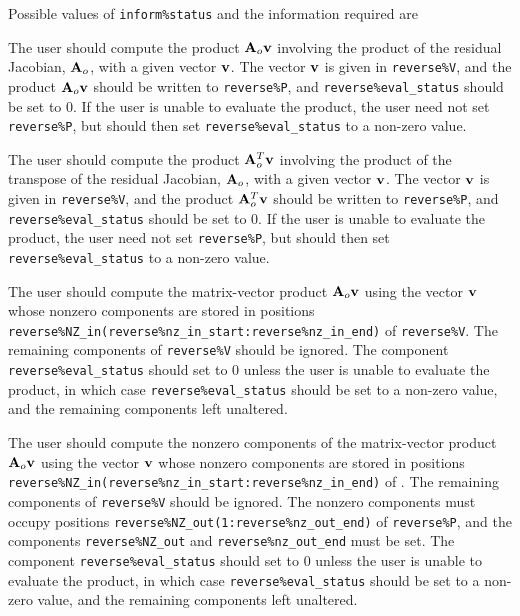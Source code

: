 \documentclass{galahad}
\begin{document}
Possible values of {\tt inform\%status} and the information required are
\begin{description}

 The user should compute the product ${\mathbf{A}}_o {\mathbf{v}}$
     involving the product of the residual Jacobian, ${\mathbf{A}}_o$,
     with a given vector ${\mathbf{v}}$.
     The vector ${\mathbf{v}}$ is given in {\tt reverse\%V}, and the
     product ${\mathbf{A}}_o {\mathbf{v}}$ should be written to {\tt reverse\%P},
     and  {\tt reverse\%eval\_status} should be set to 0.
     If the user is unable to evaluate the product,
     the user need not set {\tt reverse\%P}, but
     should then set {\tt reverse\%eval\_status} to a non-zero value.

 The user should compute the product ${\mathbf{A}}_o^T {\mathbf{v}}$
     involving the product of the transpose of the residual
     Jacobian, ${\mathbf{A}}_o$,  with a given vector ${\mathbf{v}}$.
     The vector ${\mathbf{v}}$ is given in {\tt reverse\%V}, and the
     product ${\mathbf{A}}_o^T {\mathbf{v}}$ should be written to {\tt reverse\%P},
     and  {\tt reverse\%eval\_status} should be set to 0.
     If the user is unable to evaluate the product,
     the user need not set {\tt reverse\%P}, but
     should then set {\tt reverse\%eval\_status} to a non-zero value.

 The user should compute the matrix-vector product ${\mathbf{A}}_o {\mathbf{v}}$
     using the vector ${\mathbf{v}}$ whose nonzero components are stored in positions
     {\tt reverse\%NZ\_in(reverse\%nz\_in\_start:reverse\%nz\_in\_end)}
     of {\tt reverse\%V}. The remaining components of
     {\tt reverse\%V} should be ignored.
     The component {\tt reverse\%eval\_status} should set to 0 unless the
     user is unable to evaluate the product, in which case
     {\tt reverse\%eval\_status} should be set to a non-zero value, and the
     remaining components left unaltered.

 The user should compute the nonzero components of the
     matrix-vector product ${\mathbf{A}}_o {\mathbf{v}}$ using the vector ${\mathbf{v}}$ whose
     nonzero components are stored in positions
     {\tt reverse\%NZ\_in(reverse\%nz\_in\_start:reverse\%nz\_in\_end)}
     of . The remaining components of
     {\tt reverse\%V} should be ignored. The nonzero components must
     occupy positions
     {\tt reverse\%NZ\_out(1:reverse\%nz\_out\_end)} of {\tt reverse\%P},
     and the components
     {\tt reverse\%NZ\_out} and {\tt reverse\%nz\_out\_end} must be set.
     The component {\tt reverse\%eval\_status} should set to 0 unless the
     user is unable to evaluate the product, in which case
     {\tt reverse\%eval\_status} should be set to a non-zero value, and the
      remaining components left unaltered.


\end{description}
\end{document}
